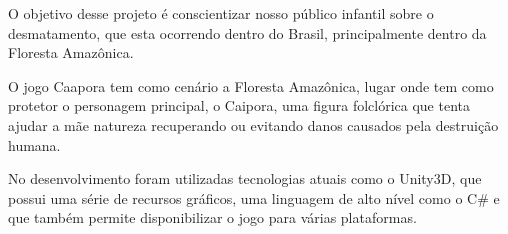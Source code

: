 O objetivo desse projeto é conscientizar nosso público infantil sobre o desmatamento, que esta ocorrendo dentro do Brasil, principalmente dentro da Floresta Amazônica.

O jogo Caapora tem como cenário a Floresta Amazônica, lugar onde tem como protetor o personagem principal, o Caipora, uma figura folclórica que tenta ajudar a mãe natureza recuperando ou evitando danos causados pela destruição humana.

No desenvolvimento foram utilizadas tecnologias atuais como o Unity3D, que possui uma série de recursos gráficos, uma linguagem de alto nível como o C\# e que também permite disponibilizar o jogo para várias plataformas.


